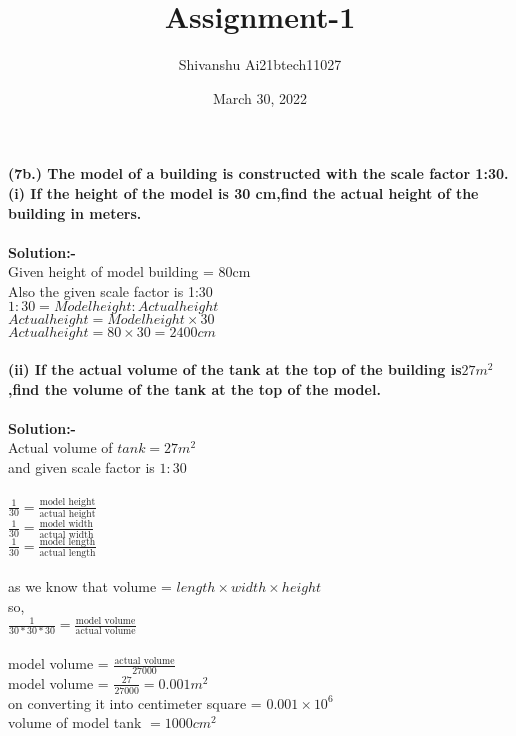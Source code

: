 \documentclass[12pt,twocolumn]{article}
\title{\textbf{Assignment-1}}
\author{Shivanshu     Ai21btech11027}
\date{March 30, 2022}
\begin{document}
\maketitle
\textbf{(7b.)\hspace{1mm} The model of a building is constructed with the scale factor 1:30.}\\

\textbf{(i) If the height of the model is 30 cm,find the actual height of the building in meters.}\\
\vspace{1mm}\\
\textbf{Solution:-}\\
Given height of model building = 80cm\\
Also the given scale factor is 1:30\\
\rightarrow $1 : 30 = Model height : Actual height$\\
\rightarrow $Actual height = Model height\times 30$\\
\rightarrow$ Actual height = 80 \times 30 = 2400 cm $\\
\vspace{2mm}\\
\textbf{(ii) If the actual volume of the tank at the top of the building is$ 27m^2 $,find the volume of the tank at the top of the model.}\\
\vspace{1mm}\\
\textbf{Solution:-}\\
Actual volume of $tank = 27m^2 $\\
 and given  scale factor is $ 1:30 $\\
\vspace{1mm}\\
$\frac{1}{30} = \frac{\text{model height}}{\text{actual height}}$ \\
$\frac{1}{30} = \frac{\text{model width}}{\text{actual width}}$ \\
$\frac{1}{30} = \frac{\text{model length}}{\text{actual length}} $\\
\vspace{1mm}\\
as we know that volume = $length\times width\times height$\\
so, \\
$\frac{1}{30*30*30} = \frac{\text{model volume}}{\text{actual volume}} $\\
\vspace{1mm}\\
model volume = $\frac{\text{actual volume}}{27000} $\\
model volume = $\frac{27}{27000} = 0.001m^2$\\
on converting it into centimeter square = $0.001 \times 10^6$\\
volume of model tank $= 1000 cm^2$\\
\end{document}
